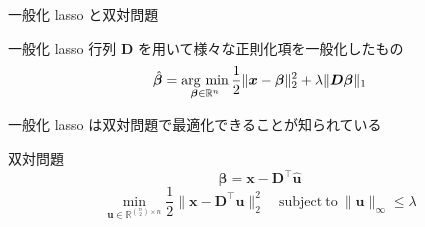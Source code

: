 \documentclass[dvipdfmx, 10pt]{beamer}
\newcommand{\argmin}{\mathop{\rm arg~min}\limits}
\begin{document}
\begin{frame}{一般化 lasso と双対問題}

    \begin{block}{一般化 lasso}
        行列 $\bm{D}$ を用いて様々な正則化項を一般化したもの
        \[
            \hat{\bm{\beta}} = \argmin_{\bm{\beta} \in \mathbb{R}^{n}} \frac{1}{2} \|\bm{x} - \bm{\beta} \|_2^2 + \lambda \|\bm{D} \bm{\beta}\|_1
        \]
    \end{block}

    一般化 lasso は双対問題で最適化できることが知られている
    \begin{block}{双対問題}
        \[
            \hat{\bm{\beta}} = \bm{x} - \bm{D}^{\top} \hat{\bm{u}}
        \]
        \[
            \underset{\bm{u} \in \mathbb{R}^{\binom{n}{2} \times n}}{\min} \frac{1}{2} \|\bm{x} - \bm{D}^{\top} \bm{u}\|_2^2 \quad \mathrm{subject\ to}\ \|\bm{u}\|_{\infty} \le \lambda
        \]
    \end{block}
    
\end{frame}

\end{document}
